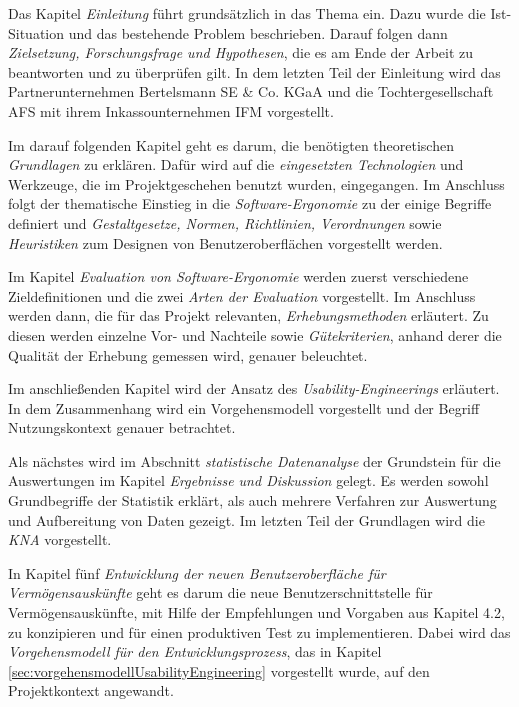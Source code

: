 Das Kapitel \textit{Einleitung} führt grundsätzlich in das Thema ein. Dazu wurde die Ist-Situation und das bestehende Problem beschrieben. Darauf folgen dann \textit{Zielsetzung, Forschungsfrage und Hypothesen}, die es am Ende der Arbeit zu beantworten und zu überprüfen gilt. In dem letzten Teil der Einleitung wird das Partnerunternehmen Bertelsmann SE \& Co. KGaA und die Tochtergesellschaft \gls{AFS} mit ihrem Inkassounternehmen \gls{IFM} vorgestellt.

Im darauf folgenden Kapitel geht es darum, die benötigten theoretischen \textit{Grundlagen} zu erklären. Dafür wird auf die \textit{eingesetzten Technologien} und Werkzeuge, die im Projektgeschehen benutzt wurden, eingegangen. Im Anschluss folgt der thematische Einstieg in die \textit{Software-Ergonomie} zu der einige Begriffe definiert und \textit{Gestaltgesetze, Normen, Richtlinien, Verordnungen} sowie \textit{Heuristiken} zum Designen von Benutzeroberflächen vorgestellt werden. 

Im Kapitel \textit{Evaluation von Software-Ergonomie} werden zuerst verschiedene Zieldefinitionen und die zwei \textit{Arten der Evaluation} vorgestellt. Im Anschluss werden dann, die für das Projekt relevanten, \textit{Erhebungsmethoden} erläutert. Zu diesen werden einzelne Vor- und Nachteile sowie \textit{Gütekriterien}, anhand derer die Qualität der Erhebung gemessen wird, genauer beleuchtet. 

Im anschließenden Kapitel wird der Ansatz des \textit{Usability-Engineerings} erläutert. In dem Zusammenhang wird ein Vorgehensmodell vorgestellt und der Begriff Nutzungskontext genauer betrachtet. 

Als nächstes wird im Abschnitt \textit{statistische Datenanalyse} der Grundstein für die Auswertungen im Kapitel \textit{Ergebnisse und Diskussion} gelegt. Es werden sowohl Grundbegriffe der Statistik erklärt, als auch mehrere Verfahren zur Auswertung und Aufbereitung von Daten gezeigt. Im letzten Teil der Grundlagen wird die \textit{\gls{KNA}} vorgestellt.

In Kapitel fünf \textit{Entwicklung der neuen Benutzeroberfläche für Vermögensauskünfte} geht es darum die neue Benutzerschnittstelle für Vermögensauskünfte, mit Hilfe der Empfehlungen und Vorgaben aus Kapitel 4.2, zu konzipieren und für einen produktiven Test zu implementieren. Dabei wird das \textit{Vorgehensmodell für den Entwicklungsprozess}, das in Kapitel \ref{sec:vorgehensmodellUsabilityEngineering} vorgestellt wurde, auf den Projektkontext angewandt.

